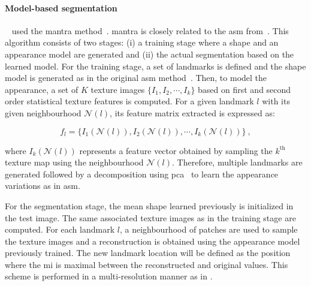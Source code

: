 \paragraph{Model-based segmentation} \citeauthor{Viswanath2009}~\cite{Viswanath2008a,Viswanath2009} used the \acs{mantra} method~\cite{Toth2008}.
\Acf{mantra} \cite{Toth2008} is closely related to the \ac{asm} from~\cite{Cootes1995}.
This algorithm consists of two stages: (i) a training stage where a shape and an appearance model are generated and (ii) the actual segmentation based on the learned model. 
For the training stage, a set of landmarks is defined and the shape model is generated as in the original \ac{asm} method~\cite{Cootes1995}.
Then, to model the appearance, a set of $K$ texture images $\{I_1,I_2,\cdots,I_k\}$ based on first and second order statistical texture features is computed.
For a given landmark $l$ with its given neighbourhood $\mathcal{N}(l)$, its feature matrix extracted is expressed as:

\begin{equation}
  f_l = \{ I_1(\mathcal{N}(l)), I_2(\mathcal{N}(l)), \cdots, I_k(\mathcal{N}(l)) \} \ ,
  \label{eq:mantra1}
\end{equation}

\noindent where $I_k(\mathcal{N}(l))$ represents a feature vector obtained by sampling the $k^{\text{th}}$ texture map using the neighbourhood $\mathcal{N}(l)$.
Therefore, multiple landmarks are generated followed by a decomposition using \ac{pca}~\cite{Pearson1901} to learn the appearance variations as in \ac{asm}.

For the segmentation stage, the mean shape learned previously is initialized in the test image.
The same associated texture images as in the training stage are computed.
For each landmark $l$, a neighbourhood of patches are used to sample the texture images and a reconstruction is obtained using the appearance model previously trained.
The new landmark location will be defined as the position where the \ac{mi} is maximal between the reconstructed and original values.
This scheme is performed in a multi-resolution manner as in \cite{Cootes1995}.

